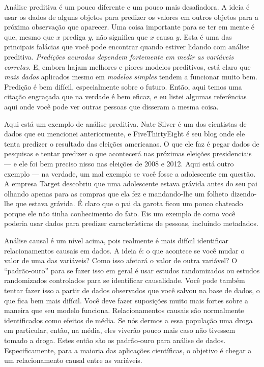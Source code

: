 \begin{multicols}{2}
\begin{footnotesize}
Análise preditiva é um pouco diferente e um pouco mais desafiadora. A ideia é usar os dados de alguns objetos para predizer os valores em outros objetos para a próxima observação que aparecer.
Uma coisa importante para se ter em mente é que, mesmo que $x$ prediga $y$, não significa que $x$ causa $y$. Esta é uma das principais falácias que você pode encontrar quando estiver lidando com análise preditiva.
\emph{Predições acuradas dependem fortemente em medir as variáveis corretas.}
E, embora hajam melhores e piores modelos preditivos, está claro que \emph{mais dados} aplicados mesmo em \emph{modelos simples} tendem a funcionar muito bem. Predição é bem difícil, especialmente sobre o futuro. Então, aqui temos uma citação engraçada que na verdade é bem eficaz, e eu listei algumas referências aqui onde você pode ver outras pessoas que disseram a mesma coisa. 

Aqui está um exemplo de análise preditiva. Nate Silver é um dos cientistas de dados que eu mencionei anteriormente, e FiveThirtyEight é seu blog onde ele tenta predizer o resultado das eleições americanas. O que ele faz é pegar dados de pesquisas e tentar predizer o que acontecerá nas próximas eleições presidenciais --- e ele foi bem preciso nisso nas eleições de 2008 e 2012. Aqui está outro exemplo --- na verdade, um mal exemplo se você fosse a adolescente em questão. A empresa Target descobriu que uma adolescente estava grávida antes do seu pai olhando apenas para as compras que ela fez e mandando-lhe um folheto dizendo-lhe que estava grávida. É claro que o pai da garota ficou um pouco chateado porque ele não tinha conhecimento do fato. Eis um exemplo de como você poderia usar dados para predizer características de pessoas, incluindo metadados. 

Análise causal é um nível acima, pois realmente é mais difícil identificar relacionamentos causais em dados. A ideia é: o que acontece se você mudar o valor de uma das variáveis? Como isso afetará o valor de outra variável? O ``padrão-ouro'' para se fazer isso em geral é usar estudos randomizados ou estudos randomizados controlados para se identificar causalidade. Você pode também tentar fazer isso a partir de dados observados que você salvou na base de dados, o que fica bem mais difícil. Você deve fazer suposições muito mais fortes sobre a maneira que seu modelo funciona. 
Relacionamentos causais são normalmente identificados como efeitos de média. Se nós dermos a essa população uma droga em particular, então, na média, eles viverão pouco mais caso não tivessem tomado a droga. Estes então são os padrão-ouro para análise de dados. Especificamente, para a maioria das aplicações científicas, o objetivo é chegar a um relacionamento causal entre as variáveis.


\end{footnotesize}
\end{multicols}
